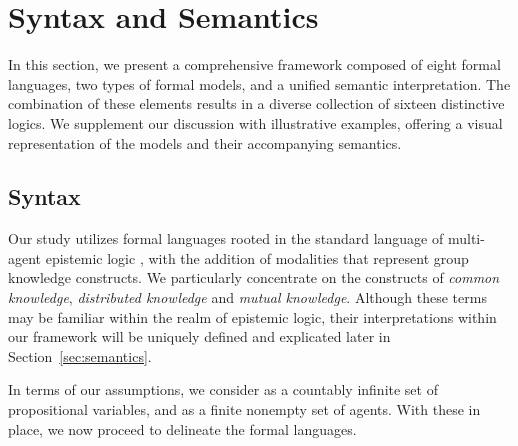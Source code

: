 \documentclass{article}
\newcommand{\ag}{\text{\normalfont\textsf{Ag}}\xspace}
\newcommand{\prop}{\text{\normalfont\textsf{Prop}}\xspace}
\begin{document}
\section{Syntax and Semantics}
\label{sec:logics}

In this section, we present a comprehensive framework composed of eight formal languages, two types of formal models, and a unified semantic interpretation. The combination of these elements results in a diverse collection of sixteen distinctive logics. We supplement our discussion with illustrative examples, offering a visual representation of the models and their accompanying semantics.

\subsection{Syntax}\label{sec:syntax}

Our study utilizes formal languages rooted in the standard language of multi-agent epistemic logic \cite{FHMV1995,MvdH1995}, with the addition of modalities that represent group knowledge constructs. We particularly concentrate on the constructs of \emph{common knowledge}, \emph{distributed knowledge} and \emph{mutual knowledge}. Although these terms may be familiar within the realm of epistemic logic, their interpretations within our framework will be uniquely defined and explicated later in Section~\ref{sec:semantics}.

In terms of our assumptions, we consider \prop as a countably infinite set of propositional variables, and \ag as a finite nonempty set of agents. With these in place, we now proceed to delineate the formal languages.
\end{document}
